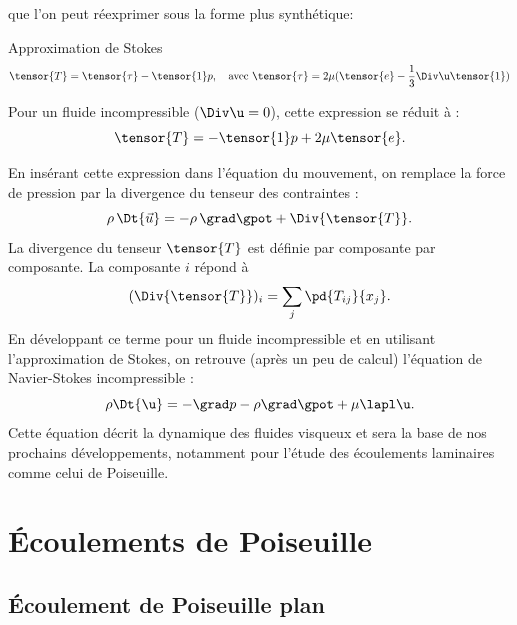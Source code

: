 \begin{redmargin}
que l'on peut réexprimer sous la forme plus synthétique:

\begin{key}{Approximation de Stokes}
\begin{equation}
  \tensor{T} = \tensor{\tau} - \tensor{1}p, \quad\text{avec}\   \tensor{\tau} = 2\mu (\tensor{e} - \frac{1}{3} \Div\u \tensor{1})
  \label{eq:tenseur_contraintes_stokes}
\end{equation}
\end{key}

Pour un fluide incompressible ($\Div \u = 0$), cette expression se réduit à :
\begin{equation}
  \tensor{T} = - \tensor{1}p + 2 \mu \tensor{e}.
  \label{eq:tenseur_contraintes_stokes_incompressible}
\end{equation}


En insérant cette expression dans l'équation du mouvement, on remplace la force de pression par la divergence du tenseur des contraintes :
\begin{equation}
  \rho \, \Dt{\vec{u}} = - \rho \, \grad \gpot + \Div{\tensor{T}}.
  \label{eq:ns}
\end{equation}
La divergence du tenseur $\tensor{T}$ est définie par composante par composante. La composante $i$ répond à
\begin{displaymath}
  (\Div{\tensor{T}})_i = \sum_j \pd{T_{ij}}{x_j}.
\end{displaymath}
En développant ce terme pour un fluide incompressible et en utilisant l'approximation de Stokes, on retrouve (après un peu de calcul) l'équation de Navier-Stokes incompressible :
\begin{equation}
  \rho \Dt{\u} = -\grad p - \rho \grad \gpot + \mu \lapl \u.
  \label{eq:ns_incompressible}
\end{equation}
Cette équation décrit la dynamique des fluides visqueux et sera la base de nos prochains développements, notamment pour l'étude des écoulements laminaires comme celui de Poiseuille.

\end{redmargin}

\section{Écoulements de Poiseuille}

\subsection{Écoulement de Poiseuille plan}

